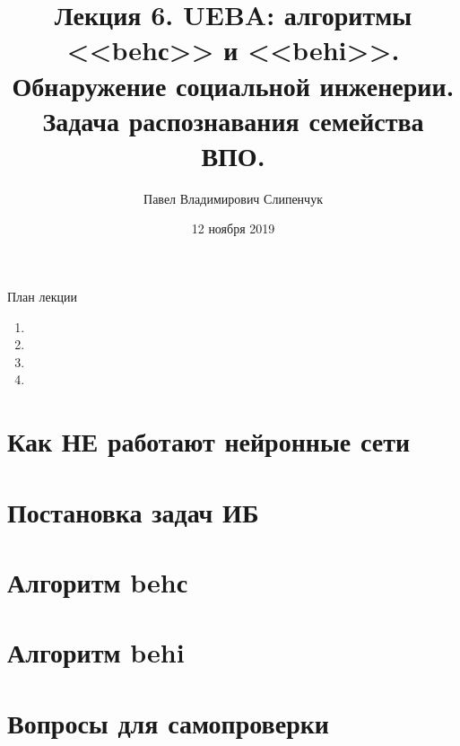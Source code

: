 


\title{Лекция 6. UEBA: алгоритмы <<behс>> и <<behi>>. Обнаружение социальной инженерии. Задача распознавания семейства ВПО.}

\date{12 ноября 2019}
\author{Павел Владимирович Слипенчук }


  \maketitle
    
\begin{frame}{План лекции}
    \begin{enumerate}
    	\item {}
		\item {}
		\item {}
		\item {}
	\end{enumerate}
\end{frame}

\section{Как НЕ работают нейронные сети}\label{section:nn_no_work}

\section{Постановка задач ИБ}\label{section:text_tasks}


\section{Алгоритм behс}\label{section:behс}


\section{Алгоритм behi}\label{section:behi}


\section{Вопросы для самопроверки}

